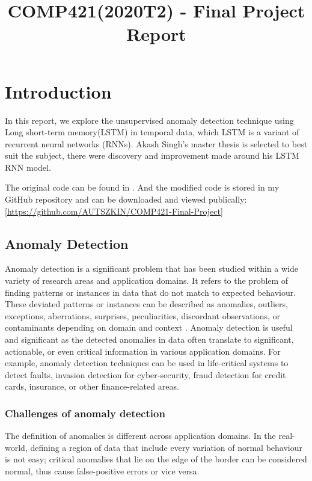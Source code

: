 \documentclass{article}
\title{COMP421(2020T2) - Final Project Report}
\begin{document}
\maketitle


\section{Introduction}
\label{sec:intro}

In this report, we explore the unsupervised anomaly detection technique using
Long short-term memory(LSTM) in temporal data, which LSTM is a variant of
recurrent neural networks (RNNs). Akash Singh's master thesis
\cite{7-lstmthisis} is selected to best suit the
subject, there were discovery and improvement made around his LSTM RNN
model.

The original code can be found in \cite{7-lstmthisis}. And the modified code is
stored in my GitHub repository and can be downloaded and viewed publically:
[\url{https://github.com/AUTSZKIN/COMP421-Final-Project}]

\subsection{Anomaly Detection}
Anomaly detection is a significant problem that has been studied within
a wide variety of research areas and application domains. It refers to the
problem of finding patterns or instances in data that do not match to expected
behaviour. These deviated patterns or instances can be described as
anomalies, outliers, exceptions, aberrations, surprises, peculiarities,
discordant observations, or contaminants depending on domain and context
\cite{1-Anomalydetection}. Anomaly detection is useful and significant as
the detected anomalies in data often translate to significant, actionable,
or even critical information in various application domains. For example,
anomaly detection
techniques can be used in life-critical systems to detect faults, invasion
detection for
cyber-security, fraud detection for credit cards, insurance, or other
finance-related areas. 

\subsubsection{Challenges of anomaly detection}
The definition of anomalies is different across application domains. In the
real-world, defining a region of data that include every variation of normal
behaviour is not easy; critical anomalies that lie on the edge of the border
can be considered normal, thus cause false-positive errors or vice versa. 
\end{document}
